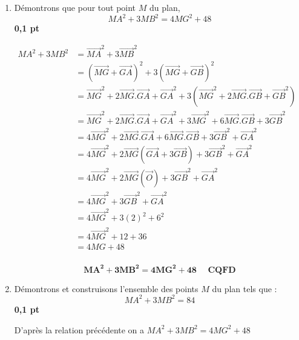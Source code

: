 \documentclass[12pt,a4paper]{article}
\begin{document}
\begin{enumerate}
    \item Démontrons que pour tout point \( M \) du plan, 
    \[
    MA^2 + 3MB^2 = 4MG^2 + 48
    \]
    \hfill \textbf{0{,}1 pt}

    \(
    \begin{aligned}
    MA^2 + 3MB^2 &= \overrightarrow{MA}^2 + 3\overrightarrow{MB}^2\\
                 &= (\overrightarrow{MG}+\overrightarrow{GA})^2 + 3(\overrightarrow{MG}+\overrightarrow{GB})^2\\
                 &= \overrightarrow{MG}^2+2\overrightarrow{MG}.\overrightarrow{GA}+\overrightarrow{GA}^2+ 3(\overrightarrow{MG}^2+2\overrightarrow{MG}.\overrightarrow{GB}+\overrightarrow{GB}^2)\\
                 &= \overrightarrow{MG}^2+2\overrightarrow{MG}.\overrightarrow{GA}+\overrightarrow{GA}^2+ 3\overrightarrow{MG}^2+6\overrightarrow{MG}.\overrightarrow{GB}+3\overrightarrow{GB}^2\\
                 &= 4\overrightarrow{MG}^2+2\overrightarrow{MG}.\overrightarrow{GA}+6\overrightarrow{MG}.\overrightarrow{GB}+3\overrightarrow{GB}^2+\overrightarrow{GA}^2\\
                 &= 4\overrightarrow{MG}^2+2\overrightarrow{MG}(\overrightarrow{GA}+3\overrightarrow{GB})+3\overrightarrow{GB}^2+\overrightarrow{GA}^2\\
                  &= 4\overrightarrow{MG}^2+2\overrightarrow{MG}(\overrightarrow{O})+3\overrightarrow{GB}^2+\overrightarrow{GA}^2\\
                  &= 4\overrightarrow{MG}^2+3\overrightarrow{GB}^2+\overrightarrow{GA}^2\\
                  &= 4\overrightarrow{MG}^2+3(2)^2+6^2\\
                  &= 4\overrightarrow{MG}^2+12+36\\
                  &= 4MG+48\\
    \end{aligned}
    \)

		        \begin{resultbox}
            \[
                \mathbf{MA^2 + 3MB^2=4MG^2+48\quad\textbf{ CQFD}}
            \]
					\end{resultbox}    
    
    \item Démontrons et construisons l'ensemble des points \( M \) du plan tels que :
    \[
    MA^2 + 3MB^2 = 84
    \]
    \hfill \textbf{0{,}1 pt}

	D'après la relation précédente on a \( MA^2 + 3MB^2=4MG^2+48 \)


\end{enumerate}
\end{document}

